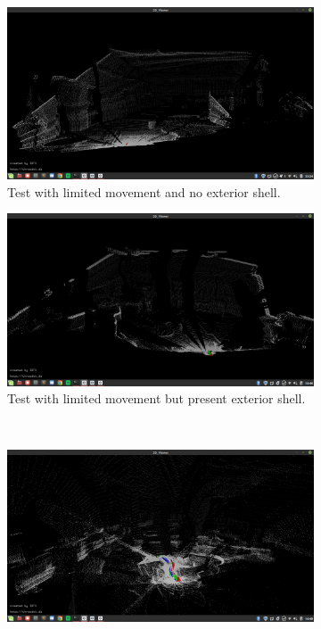 \begin{figure}
\centering
\begin{subfigure}[b]{0.49\textwidth}
	\centering
	\includegraphics[width=\textwidth,trim={0 1cm 0 1cm},clip]{../Media/FirstDecentMap}
	\caption{Test with limited movement and no exterior shell.}
	\label{sec:experimentalResults:3DLaserScanning:fig:firstpointcloud}
\end{subfigure}
\hfill
\begin{subfigure}[b]{0.49\textwidth}
	\centering
	\includegraphics[width=\textwidth,trim={0 1cm 0 1cm},clip]{../Media/testScanWithTop}
	\caption{Test with limited movement but present exterior shell.}
	\label{sec:experimentalResults:3DLaserScanning:fig:secondpointcloud}
\end{subfigure}
\\
\begin{subfigure}[b]{\textwidth}
	\centering
	\includegraphics[width=\textwidth,trim={0 1cm 0 1cm},clip]{../Media/RollingTestMap}

\end{subfigure}
\end{figure}
